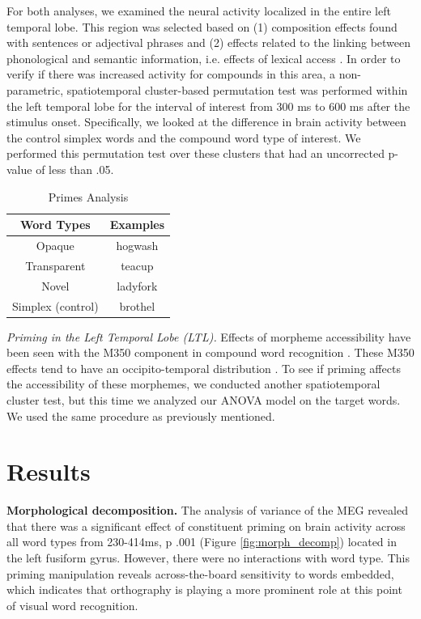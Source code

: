 \documentclass{frontiersSCNS}
\begin{document}
For both analyses, we examined the neural activity localized in the entire left temporal lobe. This region was selected based on (1) composition effects found with sentences \citep{Friederici:2000} or adjectival phrases \citep{Bemis:2011} and (2) effects related to the linking between phonological and semantic information, i.e. effects of lexical access \citep{Hickok:2007, Lau:2008}.
In order to verify if there was increased activity for compounds in this area, a non-parametric, spatiotemporal cluster-based permutation test was performed within the left temporal lobe for the interval of interest from 300 ms to 600 ms after the stimulus onset.  Specifically, we looked at the difference in brain activity between the control simplex words and the compound word type of interest. We performed this permutation test over these clusters that had an uncorrected p-value of less than .05.

\begin{table}
\centering{}%
\begin{tabular}{|c|c|}
\hline
Word Types & Examples\tabularnewline
\hline
\hline
Opaque & hogwash\tabularnewline
\hline
Transparent & teacup\tabularnewline
\hline
Novel & ladyfork\tabularnewline
\hline
Simplex (control) & brothel\tabularnewline
\hline
\end{tabular}\caption{\label{tab:Primes-Analysis} Primes Analysis}
\end{table}

\textit{Priming in the Left Temporal Lobe (LTL).} Effects of morpheme accessibility have been seen with the M350 component in compound word recognition \citep{Fiorentino:2007}. These M350 effects tend to have an occipito-temporal distribution \cite{Pylkkanen:2003}. To see if priming affects the accessibility of these morphemes, we conducted another spatiotemporal cluster test, but this time we analyzed our ANOVA model on the target words. We used the same procedure as previously mentioned.

\section{Results}
 
\textbf{Morphological decomposition.} The analysis of variance of the MEG revealed that there was a significant effect of constituent priming on brain activity across all word types from 230-414ms, p \lessthan .001 (Figure \ref{fig:morph_decomp}) located in the left fusiform gyrus. However, there were no interactions with word type. This priming manipulation reveals across-the-board sensitivity to words embedded, which indicates that orthography is playing a more prominent role at this point of visual word recognition.
\end{document}
